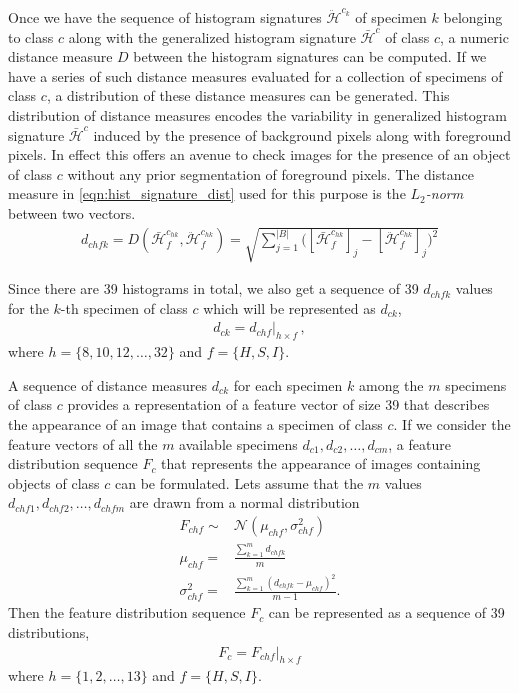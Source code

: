 \documentclass {udthesis}
\begin{document}
Once we have the sequence of histogram signatures $\ddot{\mathcal{H}}^{c_{k}}$ of specimen $k$ belonging to class $c$ along with the generalized histogram signature $\bar{\mathcal{H}}^{c}$ of class $c$, a numeric distance measure $D$ between the histogram signatures can be computed. If we have a series of such distance measures evaluated for a collection of specimens of class $c$, a distribution of these distance measures can be generated. This distribution 
of distance measures encodes the variability in generalized histogram signature $\bar{\mathcal{H}}^{c}$ induced by the presence of background pixels along with foreground pixels. In effect this offers an avenue to check images for the presence of an object of class $c$ without any prior segmentation of foreground pixels. The distance measure in  \eqref{eqn:hist_signature_dist} used for this purpose is the \emph{$L_2$-norm} between two vectors.
%
\begin{align}	\label{eqn:hist_signature_dist}
 d_{chfk} = D(\bar{\mathcal{H}}^{c_{hk}}_f, \ddot{\mathcal{H}}^{c_{hk}}_f) 
 = \sqrt{\sum_{j=1}^{|B|}\Bigg(\left[\bar{\mathcal{H}}^{c_{hk}}_f\right]_j
 -\left[\ddot{\mathcal{H}}^{c_{hk}}_f\right]_j\Bigg)^2}
\end{align}

Since there are 39 histograms in total, we also get a sequence of 39 $d_{chfk}$ values for the $k$-th specimen of class $c$ which will be represented as $d_{ck}$,
%
\begin{align}	\label{eqn:dist_sequence}
 d_{ck}=d_{chf}\Big|_{h\times f}\,,
\end{align}
%
where $h=\{8,10,12, \ldots,32\}$ and $f=\{H,S,I\}$.

A sequence of distance measures $d_{ck}$ for each specimen $k$ among the $m$ specimens of class $c$ provides a representation of a feature vector of size 39 that describes the appearance of an image that contains a specimen of class $c$. If we consider the feature vectors of all the $m$ available specimens $d_{c1},d_{c2},\ldots,d_{cm}$, a feature distribution sequence $F_c$ that represents the appearance of images containing objects of class $c$ can be formulated. Lets assume that the $m$ values $d_{chf1}, d_{chf2},\ldots,d_{chfm}$ are drawn from a normal distribution 
%
\begin{align}
 F_{chf}\sim &\mathcal{N}(\mu_{chf},\sigma^2_{chf})\label{eqn:normal_distr}\\
 \mu_{chf}= &\frac{\sum_{k=1}^m d_{chfk}}{m}\label{eqn:normal_mean}\\
 \sigma^2_{chf}= &\frac{\sum_{k=1}^m (d_{chfk}-\mu_{chf})^2}{m-1}\label{eqn:normal_stddev}.
\end{align}
%
Then the feature distribution sequence $F_c$ can be represented as a sequence of 39 distributions,
\begin{align}	\label{eqn:feat_distribution}
 F_c=F_{chf}\Big|_{h \times f}
\end{align}
where $h=\{1,2,\ldots,13\}$ and $f=\{H,S,I\}$. 
\end{document}
